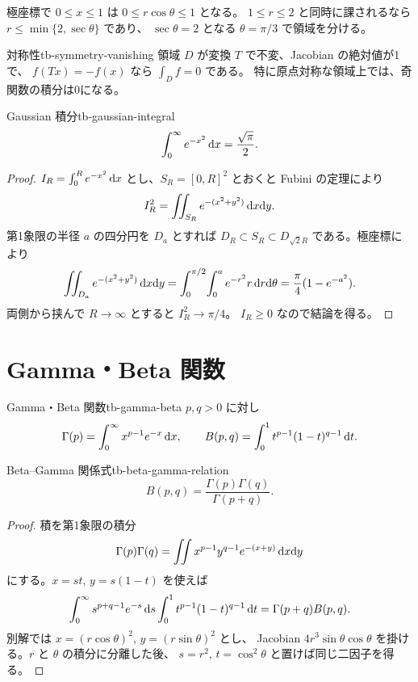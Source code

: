 極座標で $0\le x\le1$ は $0\le r\cos\theta\le1$ となる。
$1\le r\le2$ と同時に課されるなら $r\le\min\{2,\sec\theta\}$ であり、
$\sec\theta=2$ となる $\theta=\pi/3$ で領域を分ける。

\begin{proposition}{対称性}{tb-symmetry-vanishing}
領域 $D$ が変換 $T$ で不変、Jacobian の絶対値が1で、
$f(Tx)=-f(x)$ なら $\int_Df=0$ である。
特に原点対称な領域上では、奇関数の積分は0になる。
\end{proposition}

\begin{proposition}{Gaussian 積分}{tb-gaussian-integral}
\[
\int_0^\infty e^{-x^2}\,\mathrm{d} x=\frac{\sqrt\pi}{2}.
\]
\end{proposition}

\begin{proof}
$I_R=\int_0^Re^{-x^2}\,\mathrm{d} x$ とし、$S_R=[0,R]^2$ とおくと Fubini の定理により
\[
I_R^2=\iint_{S_R}e^{-(x^2+y^2)}\,\mathrm{d} x\mathrm{d} y.
\]
第1象限の半径 $a$ の四分円を $D_a$ とすれば
$D_R\subset S_R\subset D_{\sqrt2R}$ である。極座標により
\[
\iint_{D_a}e^{-(x^2+y^2)}\,\mathrm{d} x\mathrm{d} y
=\int_0^{\pi/2}\!\int_0^a e^{-r^2}r\,\mathrm{d} r\mathrm{d}\theta
=\frac\pi4(1-e^{-a^2}).
\]
両側から挟んで $R\to\infty$ とすると $I_R^2\to\pi/4$。
$I_R\ge0$ なので結論を得る。
\end{proof}

\section{Gamma・Beta 関数}

\begin{definition}{Gamma・Beta 関数}{tb-gamma-beta}
$p,q>0$ に対し
\[
\Gamma(p)=\int_0^\infty x^{p-1}e^{-x}\,\mathrm{d} x,
\qquad
B(p,q)=\int_0^1t^{p-1}(1-t)^{q-1}\,\mathrm{d} t.
\]
\end{definition}

\begin{theorem}{Beta--Gamma 関係式}{tb-beta-gamma-relation}
\[
B(p,q)=\frac{\Gamma(p)\Gamma(q)}{\Gamma(p+q)}.
\]
\end{theorem}

\begin{proof}
積を第1象限の積分
\[
\Gamma(p)\Gamma(q)=\iint x^{p-1}y^{q-1}e^{-(x+y)}\,\mathrm{d} x\mathrm{d} y
\]
にする。$x=st$, $y=s(1-t)$ を使えば
\[
\int_0^\infty s^{p+q-1}e^{-s}\,\mathrm{d} s
\int_0^1t^{p-1}(1-t)^{q-1}\,\mathrm{d} t
=\Gamma(p+q)B(p,q).
\]
別解では $x=(r\cos\theta)^2$, $y=(r\sin\theta)^2$ とし、
Jacobian $4r^3\sin\theta\cos\theta$ を掛ける。$r$ と $\theta$ の積分に分離した後、
$s=r^2$, $t=\cos^2\theta$ と置けば同じ二因子を得る。
\end{proof}

